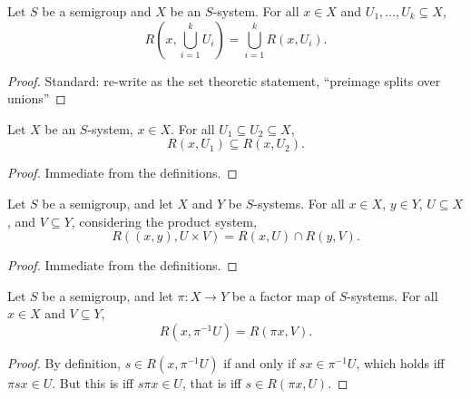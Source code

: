 \begin{lemma}
    \label{lemma_return_to_union}
    \leanok{}
    Let $S$ be a semigroup and $X$ be an $S$-system.  For all $x \in X$ and $U_1, \ldots, U_k \subseteq X$,
    \[R\left(x, \bigcup_{i=1}^k U_i \right) = \bigcup_{i=1}^k R(x,U_i).\]
\end{lemma}

\begin{proof}
\leanok{}
    Standard: re-write as the set theoretic statement, ``preimage splits over unions''
\end{proof}

\begin{lemma}
\label{lemma_monotonicity_of_rts}
\leanok{}
Let $X$ be an $S$-system, $x \in X$.  For all $U_1 \subseteq U_2 \subseteq X$,
\[R(x,U_1) \subseteq R(x,U_2).\]
\end{lemma}

\begin{proof}
\leanok{}
    Immediate from the definitions.
\end{proof}

\begin{lemma}
\label{lemma_return_time_sets_in_prod_system}
\leanok{}
Let $S$ be a semigroup, and let $X$ and $Y$ be $S$-systems.  For all $x \in X$, $y \in Y$, $U \subseteq X$, and $V \subseteq Y$, considering the product system,
\[R((x,y), U \times V) = R(x, U) \cap R(y,V).\]
\end{lemma}

\begin{proof}
\leanok{}
    Immediate from the definitions.
\end{proof}

\begin{theorem}
\label{thm_visit_time_thru_factor}
\leanok{}
    Let $S$ be a semigroup, and let $\pi: X \to Y$ be a factor map of $S$-systems.  For all $x \in X$ and $V \subseteq Y$,
    \[R(x,\pi^{-1} U) = R(\pi x, V).\]
\end{theorem}

\begin{proof}
\leanok{}
    By definition, $s \in R(x,\pi^{-1} U)$ if and only if $sx \in \pi^{-1} U$, which holds iff $\pi s x \in U$.  But this is iff $s \pi x \in U$, that is iff $s \in R(\pi x, U)$.
\end{proof}



